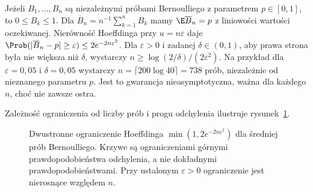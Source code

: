 \begin{przyklad}
Jeżeli $B_1,\ldots,B_n$ są niezależnymi próbami
Bernoulliego z parametrem $p\in[0,1]$, to $0\leq B_k\leq1$.
Dla $\overline B_n=n^{-1}\sum_{k=1}^n B_k$ mamy
$\E\overline B_n=p$ z liniowości wartości oczekiwanej. Nierówność Hoeffdinga
przy $u=n\varepsilon$ daje
$\Prob(|\overline B_n-p|\geq\varepsilon)
\leq2e^{-2n\varepsilon^2}$.
Dla $\varepsilon>0$ i zadanej $\delta\in(0,1)$,
aby prawa strona była nie większa niż $\delta$, wystarczy
$n\geq\log(2/\delta)/(2\varepsilon^2)$.
Na przykład dla $\varepsilon=0{,}05$ i $\delta=0{,}05$
wystarczy $n=\lceil 200\log 40\rceil=738$ prób,
niezależnie od nieznanego parametru $p$.
Jest to gwarancja nieasymptotyczna, ważna dla
każdego $n$, choć nie zawsze ostra.
\end{przyklad}

Zależność ograniczenia od liczby prób i progu
odchylenia ilustruje rysunek~\ref{fig:rp1-11-hoeffding}.

\begin{figure}[htbp]
\centering
{}
\caption{Dwustronne ograniczenie Hoeffdinga
$\min(1,2e^{-2n\varepsilon^2})$ dla średniej prób
Bernoulliego. Krzywe są ograniczeniami górnymi
prawdopodobieństwa odchylenia, a nie dokładnymi
prawdopodobieństwami. Przy ustalonym $\varepsilon>0$
ograniczenie jest nierosnące względem $n$.}
\label{fig:rp1-11-hoeffding}
\end{figure}

